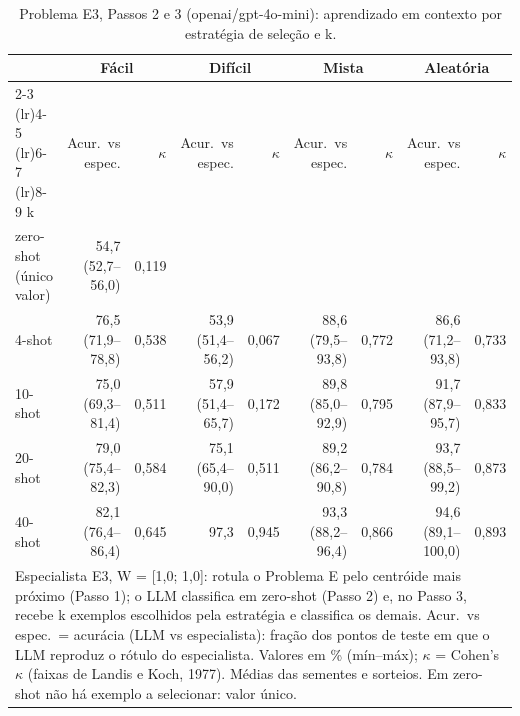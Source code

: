 \begin{table}[htbp]
\centering
\small
\caption{Problema E3, Passos 2 e 3 (openai/gpt-4o-mini): aprendizado em contexto por estratégia de seleção e k.}
\label{tab:bloco2_E3_passo3_estrategia_x_k_gpt4mini}
\begin{tabular}{lrrrrrrrr}
\toprule
 & \multicolumn{2}{c}{Fácil} & \multicolumn{2}{c}{Difícil} & \multicolumn{2}{c}{Mista} & \multicolumn{2}{c}{Aleatória} \\ \cmidrule(lr){2-3} \cmidrule(lr){4-5} \cmidrule(lr){6-7} \cmidrule(lr){8-9}
k & Acur.\ vs espec. & $\kappa$ & Acur.\ vs espec. & $\kappa$ & Acur.\ vs espec. & $\kappa$ & Acur.\ vs espec. & $\kappa$ \\
\midrule
zero-shot (único valor) & 54,7 (52,7–56,0) & 0,119 &  &  &  &  &  &  \\
4-shot & 76,5 (71,9–78,8) & 0,538 & 53,9 (51,4–56,2) & 0,067 & 88,6 (79,5–93,8) & 0,772 & 86,6 (71,2–93,8) & 0,733 \\
10-shot & 75,0 (69,3–81,4) & 0,511 & 57,9 (51,4–65,7) & 0,172 & 89,8 (85,0–92,9) & 0,795 & 91,7 (87,9–95,7) & 0,833 \\
20-shot & 79,0 (75,4–82,3) & 0,584 & 75,1 (65,4–90,0) & 0,511 & 89,2 (86,2–90,8) & 0,784 & 93,7 (88,5–99,2) & 0,873 \\
40-shot & 82,1 (76,4–86,4) & 0,645 & 97,3 & 0,945 & 93,3 (88,2–96,4) & 0,866 & 94,6 (89,1–100,0) & 0,893 \\
\bottomrule
\multicolumn{9}{p{0.95\linewidth}}{\footnotesize Especialista E3, W = [1,0; 1,0]: rotula o Problema E pelo centróide mais próximo (Passo 1); o LLM classifica em zero-shot (Passo 2) e, no Passo 3, recebe k exemplos escolhidos pela estratégia e classifica os demais. Acur.\ vs espec.\ = acurácia (LLM vs especialista): fração dos pontos de teste em que o LLM reproduz o rótulo do especialista. Valores em \% (mín–máx); $\kappa$ = Cohen's $\kappa$ (faixas de Landis e Koch, 1977). Médias das sementes e sorteios. Em zero-shot não há exemplo a selecionar: valor único.} \\
\end{tabular}
\end{table}
